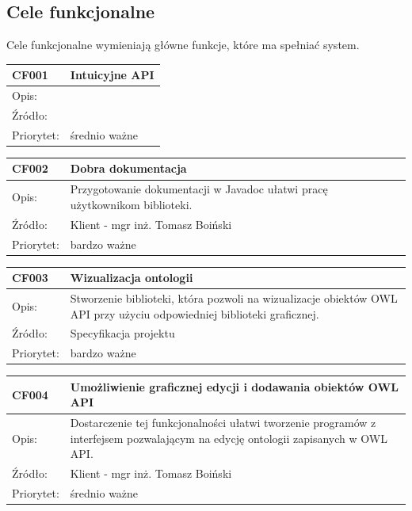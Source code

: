 \documentclass[a4paper,10pt]{article}
\begin{document}
\subsection{Cele funkcjonalne}

Cele funkcjonalne wymieniają główne funkcje, które ma spełniać system.


\begin{tabular}{|p{3cm}|p{9cm}|} \hline

CF001 & Intuicyjne API \\ \hline
Opis: &  \\ \hline
Źródło: &  \\ \hline
Priorytet: & średnio ważne  \\ \hline

\end{tabular}



\begin{tabular}{|p{3cm}|p{9cm}|} \hline

CF002 & Dobra dokumentacja \\ \hline
Opis: & Przygotowanie dokumentacji w Javadoc ułatwi pracę użytkownikom biblioteki. \\ \hline
Źródło: & Klient - mgr inż. Tomasz Boiński  \\ \hline
Priorytet: & bardzo ważne \\ \hline

\end{tabular}



\begin{tabular}{|p{3cm}|p{9cm}|} \hline

CF003 & Wizualizacja ontologii \\ \hline
Opis: & Stworzenie biblioteki, która pozwoli na wizualizacje obiektów OWL API przy użyciu odpowiedniej biblioteki graficznej. \\ \hline
Źródło:  & Specyfikacja projektu  \\ \hline
Priorytet: & bardzo ważne \\ \hline

\end{tabular}



\begin{tabular}{|p{3cm}|p{9cm}|} \hline

CF004 & Umożliwienie graficznej edycji i dodawania obiektów OWL API \\ \hline
Opis: &  Dostarczenie tej funkcjonalności ułatwi tworzenie programów z interfejsem pozwalającym na edycję ontologii zapisanych w OWL API. \\ \hline
Źródło: & Klient - mgr inż. Tomasz Boiński \\ \hline
Priorytet: & średnio ważne \\ \hline

\end{tabular}
\end{document}
